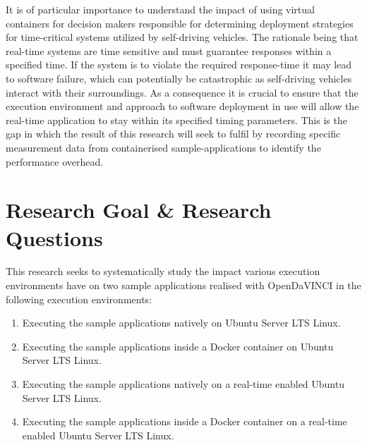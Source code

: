 It is of particular importance to understand the impact of using virtual containers for decision makers responsible for determining deployment strategies for time-critical systems utilized by self-driving vehicles. The rationale being that real-time systems are time sensitive and must guarantee responses within a specified time. If the system is to violate the required response-time it may lead to software failure, which can potentially be catastrophic as self-driving vehicles interact with their surroundings. As a consequence it is crucial to ensure that the execution environment and approach to software deployment in use will allow the real-time application to stay within its specified timing parameters. This is the gap in which the result of this research will seek to fulfil by recording specific measurement data from containerised sample-applications to identify the performance overhead.

\section{Research Goal \& Research Questions}

This research seeks to systematically study the impact various execution environments have on two sample applications realised with OpenDaVINCI in the following execution environments:\\ 

\begin{enumerate}
\item Executing the sample applications natively on Ubuntu Server LTS Linux.
\item Executing the sample applications inside a Docker container on Ubuntu Server LTS Linux.
\item Executing the sample applications natively on a real-time enabled Ubuntu Server LTS Linux.
\item Executing the sample applications inside a Docker container on a real-time enabled Ubuntu Server LTS Linux.\\
\end{enumerate}

